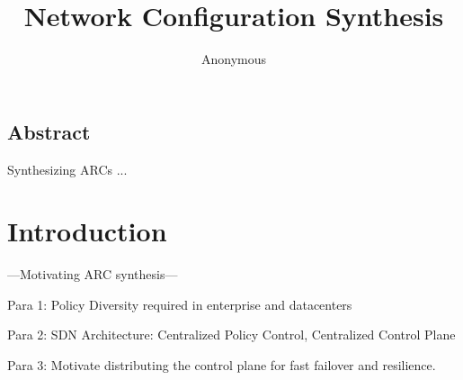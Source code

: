 \documentclass{hotnets16}
\begin{document}
 {}
\date{}


\title{Network Configuration Synthesis}

\author{Anonymous}

\maketitle


\subsection*{Abstract}

Synthesizing ARCs ...

\section{Introduction}
---Motivating ARC synthesis---

Para 1: Policy Diversity required in enterprise and datacenters

Para 2: SDN Architecture: Centralized Policy Control, Centralized Control Plane

Para 3: Motivate distributing the control plane for fast failover and resilience.
\end{document}
